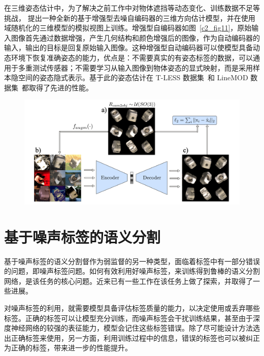 在三维姿态估计中，为了解决之前工作中对物体遮挡等动态变化、训练数据不足等挑战，\citet{Sundermeyer_2018_ECCV} 提出一种全新的基于增强型去噪自编码器的三维方向估计模型，并在使用域随机化的三维模型的模拟视图上训练。增强型自编码器如图~\ref{c2_fig11}，原始输入图像首先通过数据增强，产生几何结构和颜色增强后的图像，作为自动编码器的输入，输出的目标是回复原始输入图像。这种增强型自动编码器可以使模型具备动态环境下恢复准确姿态的能力，优点是：不需要真实的有姿态标签的数据，可以通用于多重测试传感器；不需要学习从输入图像到物体姿态的显式映射，而是采用样本隐空间的姿态隐式表示。基于此的姿态估计在 T-LESS 数据集~\citep{hodan2017t}和 LineMOD 数据集~\citep{hinterstoisser2011multimodal}都取得了先进的性能。
    \begin{figure}[tbp]
        \centering 
        \includegraphics[width=1.0\textwidth]{img/c2/rel_b5.png}
        \label{c2_fig10}
    \end{figure}

\section{基于噪声标签的语义分割}
基于噪声标签的语义分割督作为弱监督的另一种类型，面临着标签中有一部分错误的问题，即噪声标签问题。如何有效利用好噪声标签，来训练得到鲁棒的语义分割网络，是该任务的核心问题。近来已有一些工作在该任务上做了探索，并取得了一些进展。

对噪声标签的利用，就需要模型具备评估标签质量的能力，以决定使用或丢弃哪些标签。正确的标签可以让模型充分训练，而噪声标签会干扰训练结果，甚至由于深度神经网络的较强的表征能力，模型会记住这些标签错误。除了尽可能设计方法选出正确标签来使用，另一方面，利用训练过程中的信息，错误的标签也可以被纠正为正确的标签，带来进一步的性能提升。

